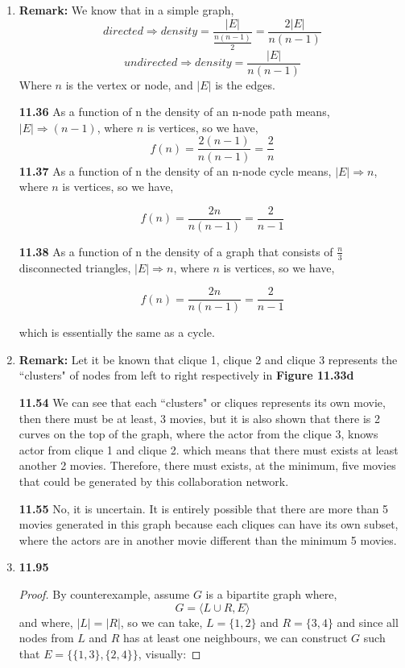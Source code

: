 \documentclass[12pt]{article}
\begin{document}
\begin{enumerate}[label=Part \Alph*)]
    \item \textbf{Remark:} We know that in a simple graph,
	$$directed \Rightarrow density = \frac{|E|}{\frac{n(n-1)}{2}} = \frac{2|E|}{n(n-1)}$$
	$$undirected \Rightarrow density =  \frac{|E|}{n(n-1)}$$
	Where $n$ is the vertex or node, and $|E|$ is the edges.
    
    \textbf{11.36} As a function of n the density of an n-node path means, $|E| \Rightarrow (n - 1)$, where $n$ is vertices, so we have,
	$$f(n) = \frac{2(n-1)}{n(n-1)} = \frac{2}{n}$$
	\textbf{11.37} As a function of n the density of an n-node cycle means, $|E| \Rightarrow n$, where $n$ is vertices, so we have,
	
	$$f(n) = \frac{2n}{n(n-1)} = \frac{2}{n - 1}$$
	
	\textbf{11.38} As a function of n the density of a graph that consists of $\frac{n}{3}$ disconnected triangles, $|E| \Rightarrow n$, where $n$ is vertices, so we have,
	
	$$f(n) = \frac{2n}{n(n-1)} = \frac{2}{n - 1}$$
	
	which is essentially the same as a cycle.
		
	\item \textbf{Remark:} Let it be known that clique 1, clique 2 and clique 3 represents the ``clusters" of nodes from left to right respectively in \textbf{Figure 11.33d}
	
	\textbf{11.54} We can see that each ``clusters" or cliques represents its own movie, then there must be at least, 3 movies, but it is also shown that there is 2 curves on the top of the graph, where the actor from the clique 3, knows actor from clique 1 and clique 2. which means that there must exists at least another 2 movies. Therefore, there must exists, at the minimum, five movies that could be generated by this collaboration network.
	
	
	
	\textbf{11.55} No, it is uncertain. It is entirely possible that there are more than 5 movies generated in this graph because each cliques can have its own subset, where the actors are in another movie different than the minimum 5 movies.
    
    \item 
    \textbf{11.95}
    \begin{proof}
    By counterexample, assume $G$ is a bipartite graph where,
    $$G = \langle L \cup R, E \rangle$$
    and where, $|L| = |R|$, so we can take, $L = \{1, 2\}$ and $R = \{3, 4\}$ and since all nodes from $L$ and $R$ has at least one neighbours, we can construct $G$ such that $E = \{\{1,3\}, \{2,4\}\}$, visually:
    

\end{proof}
\end{enumerate}
\end{document}
